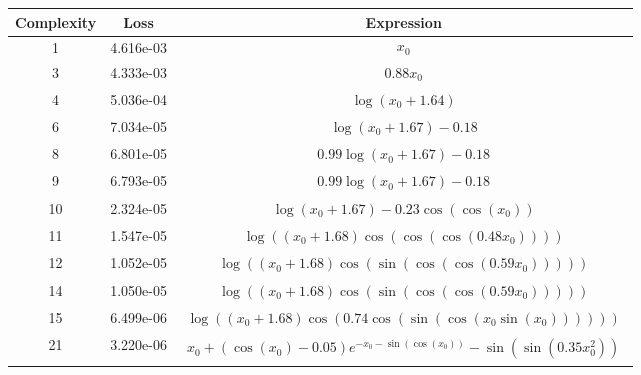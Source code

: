 \begin{center}
        \begin{tabular}{|c|c|c|}
        \hline
        Complexity & Loss & Expression \\
        \hline
        1 & 4.616e-03 & $\begin{aligned}x_{0}\end{aligned}$\\ \hline3 & 4.333e-03 & $\begin{aligned}0.88 x_{0}\end{aligned}$\\ \hline4 & 5.036e-04 & $\begin{aligned}\log{\left(x_{0} + 1.64 \right)}\end{aligned}$\\ \hline6 & 7.034e-05 & $\begin{aligned}\log{\left(x_{0} + 1.67 \right)} - 0.18\end{aligned}$\\ \hline8 & 6.801e-05 & $\begin{aligned}0.99 \log{\left(x_{0} + 1.67 \right)} - 0.18\end{aligned}$\\ \hline9 & 6.793e-05 & $\begin{aligned}0.99 \log{\left(x_{0} + 1.67 \right)} - 0.18\end{aligned}$\\ \hline10 & 2.324e-05 & $\begin{aligned}\log{\left(x_{0} + 1.67 \right)} - 0.23 \cos{\left(\cos{\left(x_{0} \right)} \right)}\end{aligned}$\\ \hline11 & 1.547e-05 & $\begin{aligned}\log{\left(\left(x_{0} + 1.68\right) \cos{\left(\cos{\left(\cos{\left(0.48 x_{0} \right)} \right)} \right)} \right)}\end{aligned}$\\ \hline12 & 1.052e-05 & $\begin{aligned}\log{\left(\left(x_{0} + 1.68\right) \cos{\left(\sin{\left(\cos{\left(\cos{\left(0.59 x_{0} \right)} \right)} \right)} \right)} \right)}\end{aligned}$\\ \hline14 & 1.050e-05 & $\begin{aligned}\log{\left(\left(x_{0} + 1.68\right) \cos{\left(\sin{\left(\cos{\left(\cos{\left(0.59 x_{0} \right)} \right)} \right)} \right)} \right)}\end{aligned}$\\ \hline15 & 6.499e-06 & $\begin{aligned}\log{\left(\left(x_{0} + 1.68\right) \cos{\left(0.74 \cos{\left(\sin{\left(\cos{\left(x_{0} \sin{\left(x_{0} \right)} \right)} \right)} \right)} \right)} \right)}\end{aligned}$\\ \hline21 & 3.220e-06 & $\begin{aligned}x_{0} + \left(\cos{\left(x_{0} \right)} - 0.05\right) e^{- x_{0} - \sin{\left(\cos{\left(x_{0} \right)} \right)}} - \sin{\left(\sin{\left(0.35 x_{0}^{2} \right)} \right)}\end{aligned}$\\ 
\end{tabular}
\end{center}
